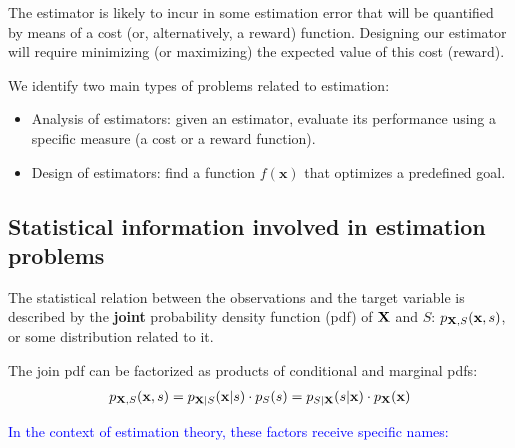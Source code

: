 The estimator is likely to incur in some estimation error that will be quantified by means of a cost (or, alternatively, a reward) function. Designing our estimator will require minimizing (or maximizing) the expected value of this cost (reward).

We identify two main types of problems related to estimation:
\begin{itemize}
\item Analysis of estimators: given an estimator, evaluate its performance using a specific measure (a cost or a reward function).
\item Design of estimators: find a function $f(\mathbf{x})$ that optimizes a predefined goal.
\end{itemize}


\subsection{Statistical information involved in estimation problems}
\label{subsec:statistical_info}

The statistical relation between the observations and the target variable is described by the {\bf joint} probability density function (pdf) of ${\bf X}$ and $S$: $p_{{\bf X},S}({\bf x},s)$, or some distribution related to it. 

The join pdf can be factorized as products of conditional and marginal pdfs:
\begin{align}
p_{{\bf X},S}({\bf x},s) = p_{{\bf X}| S}({\bf x}| s) \cdot p_S(s) 
                         = p_{S|{\bf X}}(s|{\bf x}) \cdot p_{\bf X}({\bf x}) 
\end{align}

\textcolor{blue}{In the context of estimation theory, these factors receive specific names:}

